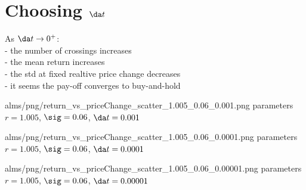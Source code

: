 \documentclass[oneside,twocolumn,12pt]{article}
\begin{document}



\newpage 

\appendix
\section{Choosing $\da t$}\label{choose}

As $\da t\to0^+$:
\\- the number of crossings increases
\\- the mean return increases
\\- the std at fixed realtive price change decreases
\\- it seems the pay-off converges to buy-and-hold

\IGS{300pt}
{alms/png/return_vs_priceChange_scatter_1.005_0.06_0.001.png}
{parameters $r=1.005$, $\sig=0.06$, $\da t = 0.001$}

\IGS{300pt}
{alms/png/return_vs_priceChange_scatter_1.005_0.06_0.0001.png}
{parameters $r=1.005$, $\sig=0.06$, $\da t = 0.0001$}

\IGS{300pt}
{alms/png/return_vs_priceChange_scatter_1.005_0.06_0.00001.png}
{parameters $r=1.005$, $\sig=0.06$, $\da t = 0.00001$}
\end{document}
